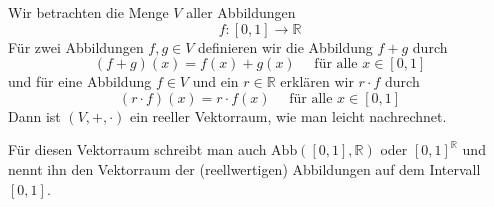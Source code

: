 %
%
%

\begin{beispiel}\label{vectorraum_abbild} Wir betrachten die Menge $V$ aller Abbildungen
  	$$ f : [0,1] \longrightarrow \mathbb R $$
Für zwei Abbildungen $f, g \in V$ definieren wir die Abbildung $f + g$ durch
  	$$ (f+g)(x) = f(x) + g(x) \quad \textrm{ für alle } x \in [0, 1] $$
und für eine Abbildung $f \in V$ und ein $r \in \mathbb R$ erklären wir $r \cdot f$ 
durch 
  	$$ (r \cdot f)(x) = r \cdot f(x) \quad \textrm{ für alle } x \in [0, 1] $$
Dann ist $(V, +, \cdot )$ ein reeller Vektorraum, wie man leicht nachrechnet.

Für diesen Vektorraum schreibt man auch $\mathrm{Abb}([0,1], \mathbb R)$ oder 
$[0,1]^{\mathbb R}$ und nennt ihn den Vektorraum der (reellwertigen) Abbildungen auf 
dem Intervall $[0,1]$. 
\end{beispiel}

